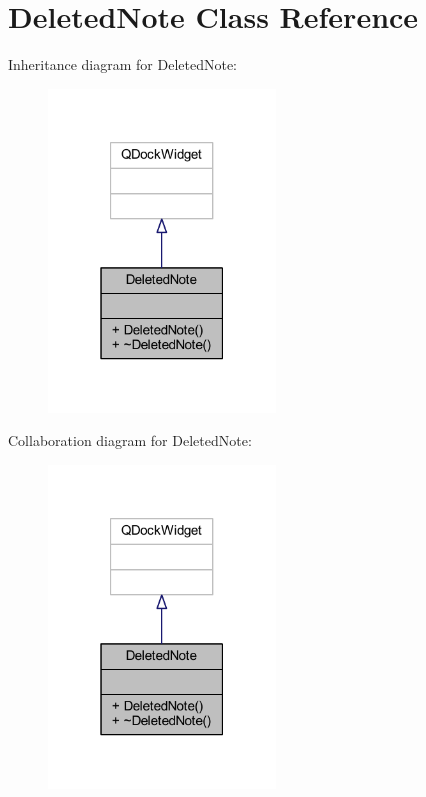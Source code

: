 \hypertarget{class_deleted_note}{}\section{Deleted\+Note Class Reference}
\label{class_deleted_note}


Inheritance diagram for Deleted\+Note\+:
\nopagebreak
\begin{figure}[H]
\begin{center}
\leavevmode
\includegraphics[width=171pt]{class_deleted_note__inherit__graph}
\end{center}
\end{figure}


Collaboration diagram for Deleted\+Note\+:
\nopagebreak
\begin{figure}[H]
\begin{center}
\leavevmode
\includegraphics[width=171pt]{class_deleted_note__coll__graph}
\end{center}
\end{figure}
